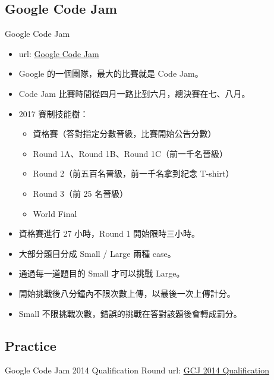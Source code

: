 \documentclass[t]{beamer}
\begin{document}
\subsection{Google Code Jam}
\begin{frame}{Google Code Jam}
  \begin{itemize}
    \item url: \href{https://code.google.com/codejam/}{\underline{Google Code Jam}}
    \item Google 的一個團隊，最大的比賽就是 Code Jam。
    \item Code Jam 比賽時間從四月一路比到六月，總決賽在七、八月。
    \item 2017 賽制技能樹：
      \begin{itemize}
        \item 資格賽（答對指定分數晉級，比賽開始公告分數）
        \item Round 1A、Round 1B、Round 1C（前一千名晉級）
        \item Round 2（前五百名晉級，前一千名拿到紀念 T-shirt）
        \item Round 3（前 25 名晉級）
        \item World Final
      \end{itemize}
    \item 資格賽進行 27 小時，Round 1 開始限時三小時。
    \item 大部分題目分成 Small / Large 兩種 case。
    \item 通過每一道題目的 Small 才可以挑戰 Large。
    \item 開始挑戰後八分鐘內不限次數上傳，以最後一次上傳計分。
    \item Small 不限挑戰次數，錯誤的挑戰在答對該題後會轉成罰分。
  \end{itemize}
\end{frame}

\subsection{Practice}
\begin{frame}{Google Code Jam 2014 Qualification Round}
  url: \href{https://code.google.com/codejam/contest/2974486/dashboard}{\underline{GCJ 2014 Qualification}}
\end{frame}
\end{document}
